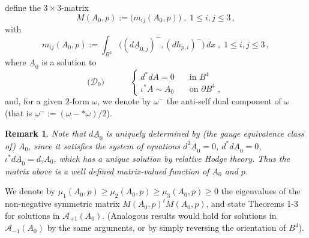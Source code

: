 \documentclass[11pt]{article}
\numberwithin{equation}{section} \setlength{\topmargin}{-35pt}
\begin{document}
define the $3\times 3$-matrix
$$M(A_0,p):=\bigl(m_{ij}(A_0,p)\bigr)\;,\; 1\le i,j\le 3\,,$$
with
$$m_{ij}(A_0,p):=\int_{B^4}\bigl((d\underline{A}_{0,j})^-,(dh_{p,i})^-\bigr) \,dx\;,\; 1\le i,j\le 3\,,$$
where $\underline{A}_0$ is a solution to
$$\bigl(\mathcal{D}_0\bigr)\qquad\quad\left\{\begin{array}{ll}
d^{\ast}dA=0\quad&\mbox{in } B^4\\
\iota^{\ast}A\sim A_0\quad&\mbox{on } \partial B^4\;,
\end{array}\right.$$
and, for a given $2$-form $\omega$, we denote by $\omega^-$ the
anti-self dual component of $\omega$ (that is
$\omega^-:=(\omega-\ast\omega)/2$).
 \usepackage{./extract}
\newtheorem{remark}{Remark}[section]
\begin{remark}
\label{R2.1} Note that $d\underline{A}_0$ is uniquely determined by
(the gauge equivalence class of) $A_0$, since it satisfies the
system of equations $d^2\underline{A}_0=0$,
$d^{\ast}d\underline{A}_0=0$, $\iota^{\ast}d\underline{A}_0=d_\tau
A_0$, which has a unique solution by relative Hodge theory. Thus the
matrix above is a well defined matrix-valued function of $A_0$ and
$p$.
\end{remark}
We denote by $\mu_1(A_0,p)\ge\mu_2(A_0,p)\ge\mu_3(A_0,p)\ge 0$ the
eigenvalues of the non-negative symmetric matrix $M(A_0,p)^t
M(A_0,p)$, and state Theorems 1-3 for solutions in
$\mathcal{A}_{+1}(A_0)$. (Analogous results would hold for solutions
in $\mathcal{A}_{-1}(A_0)$ by the same arguments, or by simply
reversing the orientation of $B^4$).
\end{document}
